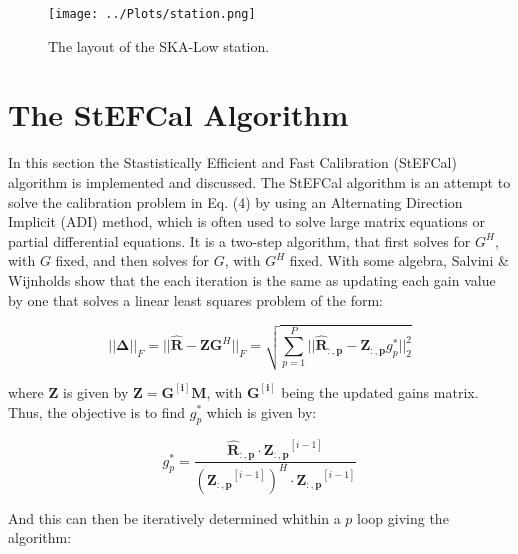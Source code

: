 \documentclass[12pt]{report} %
\begin{document}
\begin{figure}[h]
    \centering
    \texttt{[image: ../Plots/station.png]}
    \caption{The layout of the SKA-Low station.}
    \label{fig:station}
\end{figure}

\section{The StEFCal Algorithm}

In this section the Stastistically Efficient and Fast Calibration (StEFCal) algorithm is implemented and discussed\cite{salvini2014fast}. The StEFCal algorithm is an attempt to solve the calibration problem in Eq. (4) by using an Alternating Direction Implicit (ADI) method, which is often used to solve large matrix equations or partial differential equations\cite{adi_method}. It is a two-step algorithm, that first solves for $G^{H}$, with $G$ fixed, and then solves for $G$, with $G^{H}$ fixed\cite{salvini2014fast}. With some algebra, Salvini \& Wijnholds show that the each iteration is the same as updating each gain value by one that solves a linear least squares problem of the form:

\begin{equation}
    ||\mathbf{\Delta}||_{F} = ||\mathbf{\hat{R}} - \mathbf{Z}\mathbf{G}^{H}||_{F} = \sqrt{\sum_{p=1}^{P} ||\mathbf{\hat{R}_{:,p}} - \mathbf{Z_{:,p}}g^{*}_{p}||^{2}_{2}}
\end{equation}

where $\mathbf{Z}$ is given by $\mathbf{Z} = \mathbf{G^{[i]}}\mathbf{M}$, with $\mathbf{G^{[i]}}$ being the updated gains matrix. Thus, the objective is to find $g^{*}_{p}$ which is given by:

\begin{equation}
    g^{*}_{p} = \frac{\mathbf{\hat{R}_{:,p}} \cdot \mathbf{Z_{:,p}}^{[i - 1]}}{(\mathbf{Z_{:,p}}^{[i - 1]})^{H} \cdot \mathbf{Z_{:,p}}^{[i - 1]}}
\end{equation}

And this can then be iteratively determined whithin a $p$ loop giving the algorithm:
\end{document}
